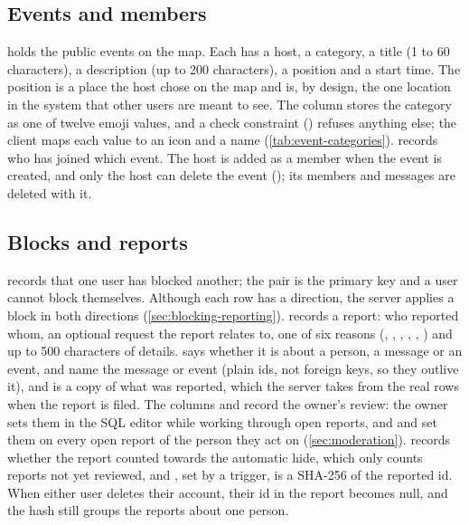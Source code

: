 \subsection{Events and members}

 holds the public events on the map. Each has a host, a category, a title (1 to 60
characters), a description (up to 200 characters), a position and a start time. The position is a place
the host chose on the map and is, by design, the one location in the system that other users are meant
to see. The  column stores the category as one of twelve emoji values, and a check
constraint () refuses anything else; the client maps each value to an icon
and a name (\cref{tab:event-categories}).  records who has joined
which event. The host is added as a member when the event is created, and only the host can delete the
event (); its members and messages are deleted with it.

\subsection{Blocks and reports}

 records that one user has blocked another; the pair is the primary key and a user cannot
block themselves. Although each row has a direction, the server applies a block in both directions
(\cref{sec:blocking-reporting}).  records a report: who reported whom, an optional request
the report relates to, one of six reasons (, , ,
, , ) and up to 500 characters of details. 
says whether it is about a person, a message or an event,  and  name the
message or event (plain ids, not foreign keys, so they outlive it), and  is a copy of what
was reported, which the server takes from the real rows when the report is filed. The columns
 and  record the owner's review: the owner sets them in the SQL editor
while working through open reports, and  and  set
them on every open report of the person they act on (\cref{sec:moderation}). 
records whether the report counted towards the automatic hide, which only counts reports not yet reviewed, and , set by a trigger, is a SHA-256 of the
reported id. When either user deletes their account, their id in the report becomes null, and the hash
still groups the reports about one person.

